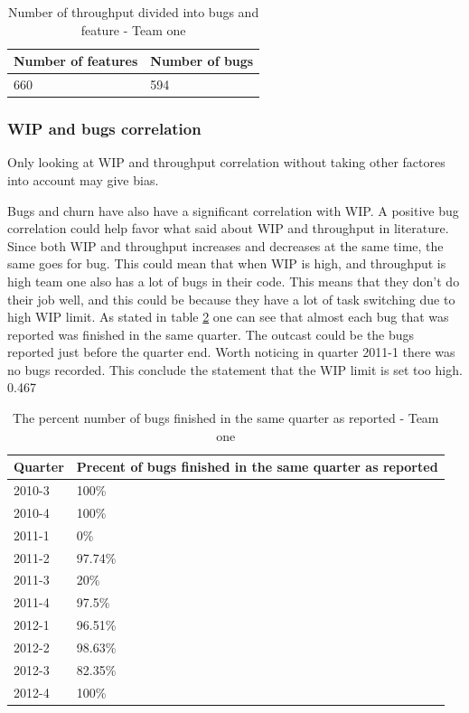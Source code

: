 \documentclass[UKenglish]{ifimaster}  %
\begin{document}
\begin{table}[!htbp]
\centering
\begin{tabular}{ | l | l | }
\hline
	Number of features & Number of bugs \\ \hline
	660 & 594 \\ \hline
\end{tabular}
   \caption{Number of throughput divided into bugs and feature - Team one}
  \label{NoT:1}%
\end{table}%
 
\newpage

\subsubsection{WIP and bugs correlation}
Only looking at WIP and throughput correlation without taking other factores into account may give bias.

Bugs and churn have also have a significant correlation with WIP.  A positive bug correlation could help favor what said about WIP and throughput in literature. Since both WIP and throughput increases and decreases at the same time, the same goes for bug. This could mean that when WIP is high, and throughput is high team one also has a lot of bugs in their code. This means that they don't do their job well, and this could be because they have a lot of task switching due to high WIP limit. As stated in table \ref{PB:1} one can see that almost each bug that was reported was finished in the same quarter. The outcast could be the bugs reported just before the quarter end. Worth noticing in quarter 2011-1 there was no bugs recorded. This conclude the statement that the WIP limit is set too high. 0.467

\begin{table}[!htbp]
\centering
\begin{tabular}{ | l |l | }
\hline
	Quarter & Precent of bugs finished in the same quarter as reported   \\ \hline
	2010-3 & 100\%   \\ \hline
	2010-4 & 100\%   \\ \hline
	2011-1 & 0\%    \\ \hline
	2011-2 & 97.74\%  \\ \hline
	2011-3 & 20\%   \\ \hline
	2011-4 & 97.5\%  \\ \hline
	2012-1 & 96.51\%  \\ \hline
	2012-2 & 98.63\%   \\ \hline
	2012-3 & 82.35\%  \\ \hline
	2012-4 & 100\%    \\ \hline
\end{tabular}
   \caption{The percent number of bugs finished in the same quarter as reported - Team one}
  \label{PB:1}%
\end{table}%
\newpage
\end{document}
